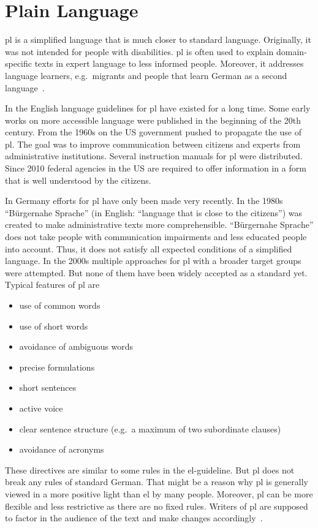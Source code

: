 \section{Plain Language}\label{sec:pl}
\gls{pl} is a simplified language that is much closer to standard language.
Originally, it was not intended for people with disabilities.
\gls{pl} is often used to explain domain-specific texts in expert language to less informed people.
Moreover, it addresses language learners, e.g.\ migrants and people that learn German as a second language~\autocite{easyLanguageBook}.

In the English language guidelines for \gls{pl} have existed for a long time.
Some early works on more accessible language were published in the beginning of the 20th century.
From the 1960s on the US government pushed to propagate the use of \gls{pl}.
The goal was to improve communication between citizens and experts from administrative institutions.
Several instruction manuals for \gls{pl} were distributed.
Since 2010 federal agencies in the US are required to offer information in a form that is well understood by the citizens.

In Germany efforts for \gls{pl} have only been made very recently.
In the 1980s \enquote{Bürgernahe Sprache} (in English: \enquote{language that is close to the citizens}) was created to make administrative texts more comprehensible.
\enquote{Bürgernahe Sprache} does not take people with communication impairments and less educated people into account.
Thus, it does not satisfy all expected conditions of a simplified language.
In the 2000s multiple approaches for \gls{pl} with a broader target groups were attempted.
But none of them have been widely accepted as a standard yet.
Typical features of \gls{pl} are
\begin{itemize}[noitemsep]
    \item use of common words
    \item use of short words
    \item avoidance of ambiguous words
    \item precise formulations
    \item short sentences
    \item active voice
    \item clear sentence structure (e.g.\ a maximum of two subordinate clauses)
    \item avoidance of acronyms
\end{itemize}
These directives are similar to some rules in the \gls{el}-guideline.
But \gls{pl} does not break any rules of standard German.
That might be a reason why \gls{pl} is generally viewed in a more positive light than \gls{el} by many people. %
Moreover, \gls{pl} can be more flexible and less restrictive as there are no fixed rules.
Writers of \gls{pl} are supposed to factor in the audience of the text and make changes accordingly~\autocite{easyLanguageBook}.

